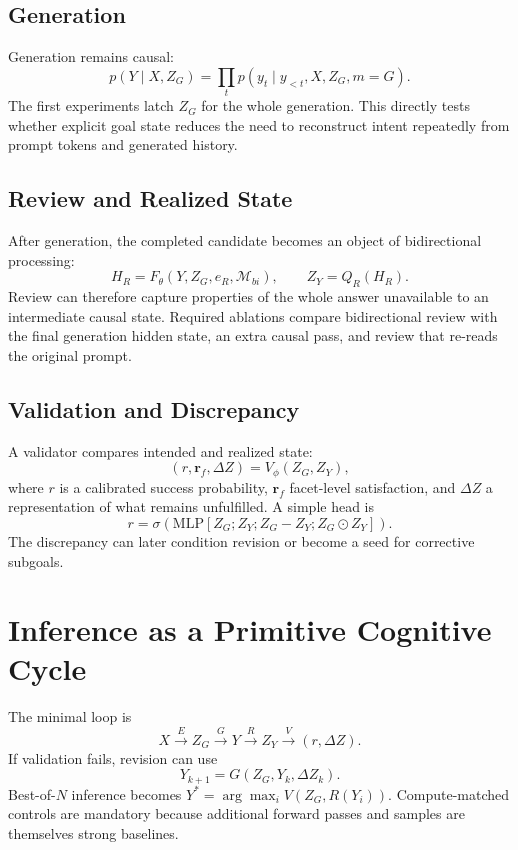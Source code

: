 \documentclass[11pt]{article}
\begin{document}
\subsection{Generation}
Generation remains causal:
\begin{equation}
p(Y\mid X,Z_G)=\prod_t p(y_t\mid y_{<t},X,Z_G,m=G).
\end{equation}
The first experiments latch $Z_G$ for the whole generation. This directly tests whether explicit goal state reduces the need to reconstruct intent repeatedly from prompt tokens and generated history.

\subsection{Review and Realized State}
After generation, the completed candidate becomes an object of bidirectional processing:
\begin{equation}
H_R=F_\theta(Y,Z_G,e_R,\mathcal M_{bi}),\qquad Z_Y=Q_R(H_R).
\end{equation}
Review can therefore capture properties of the whole answer unavailable to an intermediate causal state. Required ablations compare bidirectional review with the final generation hidden state, an extra causal pass, and review that re-reads the original prompt.

\subsection{Validation and Discrepancy}
A validator compares intended and realized state:
\begin{equation}
(r,\mathbf r_f,\Delta Z)=V_\phi(Z_G,Z_Y),
\end{equation}
where $r$ is a calibrated success probability, $\mathbf r_f$ facet-level satisfaction, and $\Delta Z$ a representation of what remains unfulfilled. A simple head is
\begin{equation}
r=\sigma(\mathrm{MLP}[Z_G;Z_Y;Z_G-Z_Y;Z_G\odot Z_Y]).
\end{equation}
The discrepancy can later condition revision or become a seed for corrective subgoals.

\section{Inference as a Primitive Cognitive Cycle}
The minimal loop is
\begin{equation}
X\xrightarrow{E}Z_G\xrightarrow{G}Y\xrightarrow{R}Z_Y\xrightarrow{V}(r,\Delta Z).
\end{equation}
If validation fails, revision can use
\begin{equation}
Y_{k+1}=G(Z_G,Y_k,\Delta Z_k).
\end{equation}
Best-of-$N$ inference becomes $Y^*=\arg\max_i V(Z_G,R(Y_i))$. Compute-matched controls are mandatory because additional forward passes and samples are themselves strong baselines.
\end{document}

